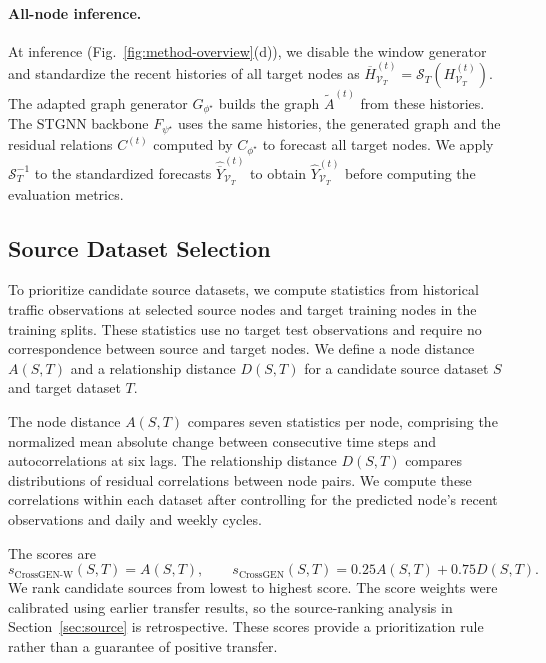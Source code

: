 \documentclass[runningheads,a4paper]{llncs}
\begin{document}
\paragraph{All-node inference.}
At inference (Fig.~\ref{fig:method-overview}(d)), we disable the window generator and standardize the recent histories of all target nodes as $\overline H_{\mathcal V_T}^{(t)}=\mathcal S_T(H_{\mathcal V_T}^{(t)})$. The adapted graph generator $G_{\phi^\star}$ builds the graph $\tilde A^{(t)}$ from these histories. The STGNN backbone $F_{\psi^\star}$ uses the same histories, the generated graph and the residual relations $C^{(t)}$ computed by $C_{\phi^\star}$ to forecast all target nodes. We apply $\mathcal S_T^{-1}$ to the standardized forecasts $\widehat{\overline Y}_{\mathcal V_T}^{(t)}$ to obtain $\widehat Y_{\mathcal V_T}^{(t)}$ before computing the evaluation metrics.


\subsection{Source Dataset Selection}
\label{sec:source-selection}

To prioritize candidate source datasets, we compute statistics from historical traffic observations at selected source nodes and target training nodes in the training splits. These statistics use no target test observations and require no correspondence between source and target nodes. We define a node distance $A(S,T)$ and a relationship distance $D(S,T)$ for a candidate source dataset $S$ and target dataset $T$.

The node distance $A(S,T)$ compares seven statistics per node, comprising the normalized mean absolute change between consecutive time steps and autocorrelations at six lags. The relationship distance $D(S,T)$ compares distributions of residual correlations between node pairs. We compute these correlations within each dataset after controlling for the predicted node's recent observations and daily and weekly cycles.

The scores are
\[
s_{\text{CrossGEN-W}}(S,T)=A(S,T),\qquad
s_{\text{CrossGEN}}(S,T)=0.25A(S,T)+0.75D(S,T).
\]
We rank candidate sources from lowest to highest score. The score weights were calibrated using earlier transfer results, so the source-ranking analysis in Section~\ref{sec:source} is retrospective. These scores provide a prioritization rule rather than a guarantee of positive transfer.
\end{document}
